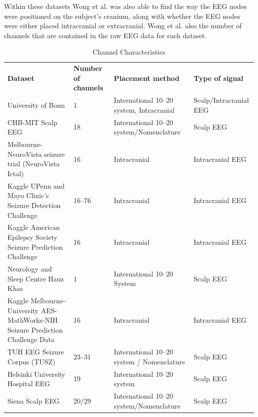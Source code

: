 \documentclass[12pt]{article}
\begin{document}
Within these datasets Wong et al. was also able to find the way the EEG nodes were positioned on the subject's cranium, along with whether the EEG nodes were either placed intracranial or extracranial. Wong et al. also the number of channels that are contained in the raw EEG data for each dataset.

\begin{table}[H]
\centering
\begin{tabular}{p{}p{}p{}p{}}
\textbf{Dataset}                                              & \textbf{Number of channels} & \textbf{Placement method}                & \textbf{Type of signal} \\
University of Bonn                                            & 1                           & International 10–20 system, Intracranial & Scalp/Intracranial EEG  \\
CHB-MIT Scalp EEG                                             & 18                          & International 10–20 system/Nomenclature  & Scalp EEG               \\
Melbourne-NeuroVista seizure trial (NeuroVista Ictal)         & 16                          & Intracranial                             & Intracranial EEG        \\
Kaggle UPenn and Mayo Clinic's Seizure Detection Challenge    & 16–76                       & Intracranial                             & Intracranial EEG        \\
Kaggle American Epilepsy Society Seizure Prediction Challenge & 16                          & Intracranial                             & Intracranial EEG        \\
Neurology and Sleep Centre Hauz Khas                          & 1                           & International 10–20 System               & Scalp EEG               \\
Kaggle Melbourne-University AES-MathWorks-NIH Seizure Prediction Challenge Data & 16 & Intracranial & Intracranial EEG \\
TUH EEG Seizure Corpus (TUSZ)                                 & 23–31                       & International 10–20 system / Nomenclature & Scalp EEG               \\
Helsinki University Hospital EEG                              & 19                          & International 10–20 system               & Scalp EEG               \\
Siena Scalp EEG                                               & 20/29                       & International 10–20 system/Nomenclature  & Scalp EEG              
\end{tabular}
\caption{Channel Characteristics}
\end{table}
\end{document}
